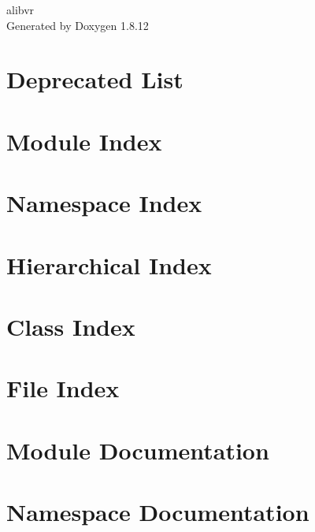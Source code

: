 \documentclass[twoside]{book}
\newcommand{\+}{\discretionary{\mbox{\scriptsize$\hookleftarrow$}}{}{}}
\newcommand{\clearemptydoublepage}{%
  \newpage{\pagestyle{empty}\cleardoublepage}%
}
\begin{document}
\hypersetup{pageanchor=false,
             bookmarksnumbered=true,
             pdfencoding=unicode
            }
\begin{titlepage}
\vspace*{7cm}
\begin{center}%
{\Large alibvr }\\
\vspace*{1cm}
{\large Generated by Doxygen 1.8.12}\\
\end{center}
\end{titlepage}
\clearemptydoublepage
{}
\tableofcontents
\clearemptydoublepage
{}
\hypersetup{pageanchor=true}

\chapter{Deprecated List}
\label{deprecated}
\hypertarget{deprecated}{}

\chapter{Module Index}

\chapter{Namespace Index}

\chapter{Hierarchical Index}

\chapter{Class Index}

\chapter{File Index}

\chapter{Module Documentation}

\chapter{Namespace Documentation}





\end{document}

